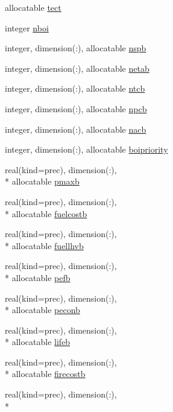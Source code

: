 \begin{DoxyCompactItemize}
allocatable \hyperlink{classinputvar_afb7d5163d753c7bbd2c1505e8ee68197}{tect}
\item 
integer \hyperlink{classinputvar_a168bc1dcb73e68b3620991b6494f3797}{nboi}
\item 
integer, dimension(\-:), allocatable \hyperlink{classinputvar_aa1e78ecd4b3cbb3f08b770cf604a5d3d}{nspb}
\item 
integer, dimension(\-:), allocatable \hyperlink{classinputvar_af109996c7b379bac5d6c3d89c5b6df1d}{netab}
\item 
integer, dimension(\-:), allocatable \hyperlink{classinputvar_a41aaaf97cb1f1e815c73bcfa5f975be3}{ntcb}
\item 
integer, dimension(\-:), allocatable \hyperlink{classinputvar_a4f83c89634ccb8f94fca08a023648791}{npcb}
\item 
integer, dimension(\-:), allocatable \hyperlink{classinputvar_ae517f545e388b4352b7941203efa8449}{nacb}
\item 
integer, dimension(\-:), allocatable \hyperlink{classinputvar_a87efe639d66848f1a52e1c265e175e2c}{boipriority}
\item 
real(kind=prec), dimension(\-:), \\*
allocatable \hyperlink{classinputvar_a29e37a8460969d1438ed9aeb5d37d798}{pmaxb}
\item 
real(kind=prec), dimension(\-:), \\*
allocatable \hyperlink{classinputvar_a7ba5eba73efe4e693920d6af7782e58e}{fuelcostb}
\item 
real(kind=prec), dimension(\-:), \\*
allocatable \hyperlink{classinputvar_a3cd62c9288fded8bd8de8066cbb3ca20}{fuellhvb}
\item 
real(kind=prec), dimension(\-:), \\*
allocatable \hyperlink{classinputvar_a3484e64c94e8f61527a9843039243703}{pefb}
\item 
real(kind=prec), dimension(\-:), \\*
allocatable \hyperlink{classinputvar_adfc7efd23b85b75ea9411b9da5e8ccbd}{peconb}
\item 
real(kind=prec), dimension(\-:), \\*
allocatable \hyperlink{classinputvar_a74dcd10e62524e2f5145df13548eae82}{lifeb}
\item 
real(kind=prec), dimension(\-:), \\*
allocatable \hyperlink{classinputvar_a1560f8312d0c0606566ee8f7e21c1e49}{firecostb}
\item 
real(kind=prec), dimension(\-:), \\*

\end{DoxyCompactItemize}
